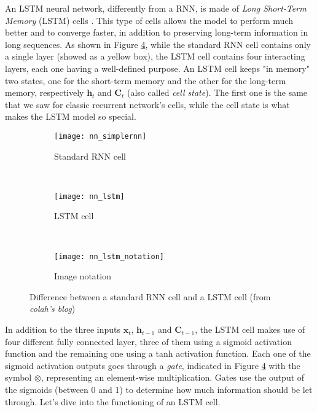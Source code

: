 An LSTM neural network, differently from a RNN, is made of \textit{Long Short-Term Memory} (LSTM) cells \cite{NeuralComputation:lstm}. This type of cells allows the model to perform much better and to converge faster, in addition to preserving long-term information in long sequences. As shown in Figure \ref{fig:rnn_vs_lstm}, while the standard RNN cell contains only a single layer (showed as a yellow box), the LSTM cell contains four interacting layers, each one having a well-defined purpose. An LSTM cell keeps "in memory" two states, one for the short-term memory and the other for the long-term memory, respectively $\mathbf{h}_t$ and $\mathbf{C}_t$ (also called \textit{cell state}). The first one is the same that we saw for classic recurrent network's cells, while the cell state is what makes the LSTM model so special.
\begin{figure}[t]
    \centering
    \begin{subfigure}[t]{0.8\textwidth}
		\texttt{[image: nn\_simplernn]}
        \caption{Standard RNN cell}
        \label{fig:nn_simplernn}
	\end{subfigure}
	~
	\begin{subfigure}[t]{0.8\textwidth}
		\texttt{[image: nn\_lstm]}
        \caption{LSTM cell}
        \label{fig:nn_lstm}
    \end{subfigure}
    ~
    \begin{subfigure}[t]{0.6\textwidth}
		\texttt{[image: nn\_lstm\_notation]}
        \caption{Image notation}
        \label{fig:nn_lstm_notation}
	\end{subfigure}
    \caption{Difference between a standard RNN cell and a LSTM cell (from \textit{colah's blog})}
    \label{fig:rnn_vs_lstm}
\end{figure}

In addition to the three inputs $\mathbf{x}_t$, $\mathbf{h}_{t-1}$ and $\mathbf{C}_{t-1}$, the LSTM cell makes use of four different fully connected layer, three of them using a sigmoid activation function and the remaining one using a tanh activation function. Each one of the sigmoid activation outputs goes through a \textit{gate}, indicated in Figure \ref{fig:rnn_vs_lstm} with the symbol $\otimes$, representing an element-wise multiplication. Gates use the output of the sigmoids (between 0 and 1) to determine how much information should be let through. Let's dive into the functioning of an LSTM cell.

